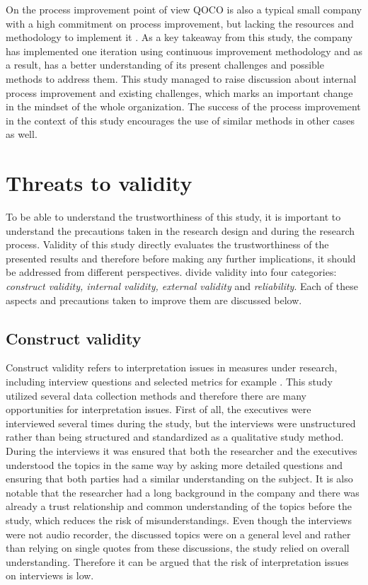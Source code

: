 On the process improvement point of view QOCO is also a typical small company with a high commitment on process improvement, but lacking the resources and methodology to implement it \citep{Basri2010a}. 
As a key takeaway from this study, the company has implemented one iteration using continuous improvement methodology and as a result, has a better understanding of its present challenges and possible methods to
address them. This study managed to raise discussion about internal process improvement and existing challenges, which marks an important change in the mindset of the whole organization. The success of the
process improvement in the context of this study encourages the use of similar methods in other cases as well.

\section{Threats to validity}

To be able to understand the trustworthiness of this study, it is important to understand the precautions taken in the research design and during the research process. Validity of this study directly evaluates
the trustworthiness of the presented results and therefore before making any further implications, it should be addressed from different perspectives. \citet[p.~71-72]{Runeson2012} divide
validity into four categories:
\emph{construct validity, internal validity, external validity} and \emph{reliability}. Each of these aspects and precautions taken to improve them are discussed below.

\subsection{Construct validity}

Construct validity refers to interpretation issues in measures under research, including interview questions and selected metrics for example \citep{Runeson2012}. This study utilized several data collection
methods and therefore there are many opportunities for interpretation issues. First of all, the executives were interviewed several times during the study, but the interviews were unstructured rather than
being structured and standardized as a qualitative study method. During the interviews it was ensured that both the researcher and the executives understood the topics in the same way by asking more detailed questions
and ensuring that both parties had a similar understanding on the subject. It is also notable that the researcher had a long background in the company and there was already a trust relationship and common understanding of 
the topics before the study, which reduces the risk of misunderstandings.
Even though the interviews were not audio recorder, the discussed topics were on a general level and rather than relying on single quotes from these
discussions, the study relied on overall understanding. Therefore it can be argued that the risk of interpretation issues on interviews is low.

